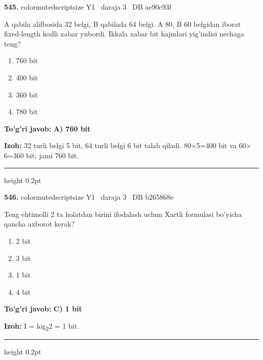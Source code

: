 \documentclass[10pt,a4paper,oneside]{article}
\begin{document}
\noindent\textbf{\color{ink}545.}  {color{muted}scriptsize Y1 \textbullet\ daraja 3 \textbullet\ DB ae90c93f}
\par
A qabila alifbosida 32 belgi, B qabilada 64 belgi. A 80, B 60 belgidan iborat fixed-length kodli xabar yubordi. Ikkala xabar bit hajmlari yig'indisi nechaga teng?
\begin{enumerate}[label=\Alph*),leftmargin=9mm]
\item 760 bit
\item 400 bit
\item 360 bit
\item 780 bit
\end{enumerate}
\begin{tcolorbox}[enhanced,breakable,colback=teal!4,colframe=teal!50!black,boxrule=0.5pt,arc=1.1mm,left=3mm,right=3mm,top=1.7mm,bottom=1.7mm,before skip=2mm,after skip=2mm]
\textbf{\color{teal}To'g'ri javob:} \textbf{A) 760 bit}
\par\smallskip
\textbf{Izoh:} 32 turli belgi 5 bit, 64 turli belgi 6 bit talab qiladi. 80\ensuremath{\times}5=400 bit va 60\ensuremath{\times}6=360 bit; jami 760 bit.
\end{tcolorbox}
\vspace{2mm}\hrule height 0.2pt \vspace{3mm}

\noindent\textbf{\color{ink}546.}  {color{muted}scriptsize Y1 \textbullet\ daraja 3 \textbullet\ DB b265868e}
\par
Teng ehtimolli 2 ta holatdan birini ifodalash uchun Xartli formulasi bo'yicha qancha axborot kerak?
\begin{enumerate}[label=\Alph*),leftmargin=9mm]
\item 2 bit
\item 3 bit
\item 1 bit
\item 4 bit
\end{enumerate}
\begin{tcolorbox}[enhanced,breakable,colback=teal!4,colframe=teal!50!black,boxrule=0.5pt,arc=1.1mm,left=3mm,right=3mm,top=1.7mm,bottom=1.7mm,before skip=2mm,after skip=2mm]
\textbf{\color{teal}To'g'ri javob:} \textbf{C) 1 bit}
\par\smallskip
\textbf{Izoh:} I = log\textsubscript{2}2 = 1 bit.
\end{tcolorbox}
\vspace{2mm}\hrule height 0.2pt \vspace{3mm}
\end{document}
